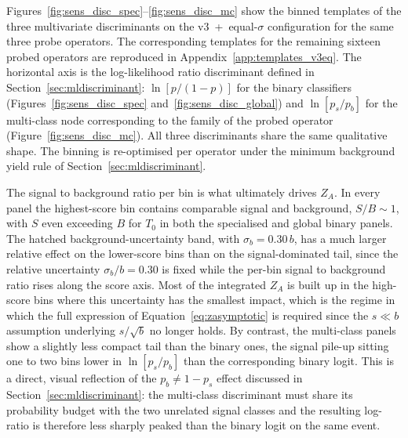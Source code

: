 Figures~\ref{fig:sens_disc_spec}--\ref{fig:sens_disc_mc} show the binned templates of the three multivariate discriminants on the v3~+~equal-$\sigma$ configuration for the same three probe operators. The corresponding templates for the remaining sixteen probed operators are reproduced in Appendix~\ref{app:templates_v3eq}. The horizontal axis is the log-likelihood ratio discriminant defined in Section~\ref{sec:mldiscriminant}: $\ln[p/(1-p)]$ for the binary classifiers (Figures~\ref{fig:sens_disc_spec} and~\ref{fig:sens_disc_global}) and $\ln[p_s/p_b]$ for the multi-class node corresponding to the family of the probed operator (Figure~\ref{fig:sens_disc_mc}). All three discriminants share the same qualitative shape. The binning is re-optimised per operator under the minimum background yield rule of Section~\ref{sec:mldiscriminant}. 

The signal to background ratio per bin is what ultimately drives $Z_A$. In every panel the highest-score bin contains comparable signal and background, $S/B\sim 1$, with $S$ even exceeding $B$ for $T_0$ in both the specialised and global binary panels. The hatched background-uncertainty band, with $\sigma_b=0.30\,b$, has a much larger relative effect on the lower-score bins than on the signal-dominated tail, since the relative uncertainty $\sigma_b/b=0.30$ is fixed while the per-bin signal to background ratio rises along the score axis. Most of the integrated $Z_A$ is built up in the high-score bins where this uncertainty has the smallest impact, which is the regime in which the full expression of Equation~\eqref{eq:zasymptotic} is required since the $s\ll b$ assumption underlying $s/\sqrt{b}$ no longer holds. By contrast, the multi-class panels show a slightly less compact tail than the binary ones, the signal pile-up sitting one to two bins lower in $\ln[p_s/p_b]$ than the corresponding binary logit. This is a direct, visual reflection of the $p_b\neq 1-p_s$ effect discussed in Section~\ref{sec:mldiscriminant}: the multi-class discriminant must share its probability budget with the two unrelated signal classes and the resulting log-ratio is therefore less sharply peaked than the binary logit on the same event.

